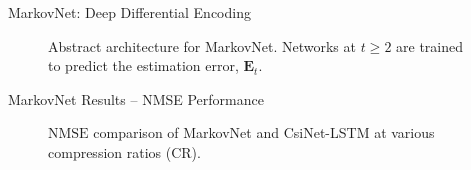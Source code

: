 \documentclass{beamer}
\begin{document}
  \begin{frame}{MarkovNet: Deep Differential Encoding}
    \begin{figure}[!hbtp]
    \centering
    {
      \fontsize{4pt}{6pt}
      \def\svgwidth{0.8\columnwidth}
      
    }
    \caption{Abstract architecture for MarkovNet. Networks at $t \geq 2$ are trained to predict the estimation error, $\mathbf E_t$.}
    \label{fig:markovnet_schema}
    \end{figure}
  \end{frame}

  \begin{frame}{MarkovNet Results -- NMSE Performance}
    \begin{figure}[!hbtp] \centering 
      \vspace*{-3mm}

      \caption{$\text{NMSE}$ comparison of MarkovNet and CsiNet-LSTM 
      at various compression ratios (CR).} 
      \label{fig:diffnet_result} \vspace*{-2mm}
    \end{figure}  
  \end{frame}
\end{document}
